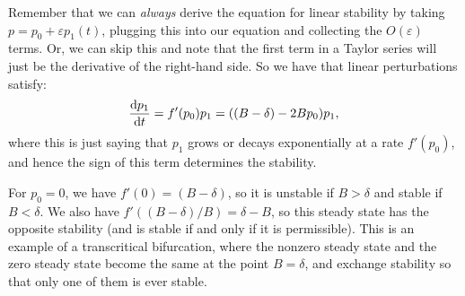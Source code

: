 \documentclass[a4paper,12pt]{article}
\begin{document}
\begin{enumerate}[label=(\alph*)]
{    Remember that we can \emph{always} derive the equation for linear stability by taking $p = p_0 + \varepsilon p_1(t)$, plugging this into our equation and collecting the $O(\varepsilon)$ terms. Or, we can skip this and note that the first term in a Taylor series will just be the derivative of the right-hand side. So we have that linear perturbations satisfy:
    $$
    \fd{p_1}{t} = f'(p_0)p_1 = ((B-\delta) - 2Bp_0)p_1,
    $$
    where this is just saying that $p_1$ grows or decays exponentially at a rate $f'(p_0)$, and hence the sign of this term determines the stability.
    
    For $p_0=0$, we have $f'(0) = (B-\delta)$, so it is unstable if $B> \delta$ and stable if $B < \delta$. We also have $f'((B-\delta)/B) = \delta-B$, so this steady state has the opposite stability (and is stable if and only if it is permissible). This is an example of a transcritical bifurcation, where the nonzero steady state and the zero steady state become the same at the point $B = \delta$, and exchange stability so that only one of them is ever stable.
    }
\end{enumerate}
\end{document}
